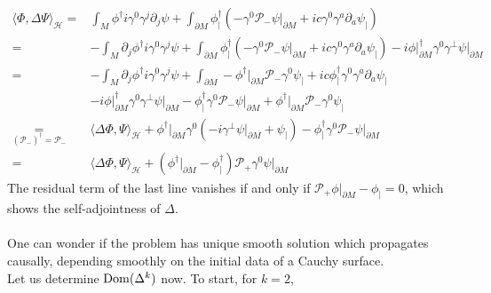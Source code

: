 \begin{equation}
\begin{split}
\langle \Phi, \Delta \Psi \rangle _\mathcal{H}
 = & \int_M \phi^\dagger i \gamma^0 \gamma^j \partial_j \psi 
+ \int_{\partial M} \phi^\dagger_|(  -\gamma^0\mathcal{P}_- \psi\vert_{\partial M} + ic \gamma^0 \gamma^a \partial_a\psi_|)   \\
 = & - \int_M \partial_j \phi^\dagger i \gamma^0 \gamma^j \psi 
+ \int_{\partial M} \phi^\dagger_|(-\gamma^0 \mathcal{P}_- \psi\vert_{\partial M} + ic \gamma^0 \gamma^a \partial_a  \psi_|) 
- i\phi\vert_{\partial M}^\dagger \gamma^0 \gamma^\bot \psi\vert_{\partial M}   \\
= &
- \int_M \partial_j \phi^\dagger i \gamma^0 \gamma^j \psi 
+ \int_{\partial M} - \phi^\dagger\vert_{\partial M}\mathcal{P}_- \gamma^0 \psi_| + ic \phi^\dagger_|\gamma^0 \gamma^a \partial_a  \psi_|  \\
& - i \phi\vert_{\partial M}^\dagger \gamma^0 \gamma^\bot \psi\vert_{\partial M} 
-\phi_|^\dagger \gamma^0 \mathcal{P}_- \psi\vert_{\partial M} 
+ \phi^\dagger\vert_{\partial M}\mathcal{P}_- \gamma^0 \psi_| \\
\underset{(\mathcal{P}_-)^\dagger = \mathcal{P}_-}{=} 
& \langle \Delta\Phi, \Psi \rangle_\mathcal{H}
+\phi^\dagger\vert_{\partial M} \gamma^0 (-i \gamma^\bot \psi\vert_{\partial M} + \psi_|)
- \phi_|^\dagger \gamma^0 \mathcal{P}_- \psi\vert_{\partial M} \\
= & \langle \Delta\Phi, \Psi \rangle_\mathcal{H}
+ (\phi^\dagger\vert_{\partial M} - \phi_|^\dagger)\mathcal{P}_+ \gamma^0 \psi\vert_{\partial M}
\end{split}
\end{equation}
The residual term of the last line vanishes if and only if $\mathcal{P}_+\phi \vert_{\partial M} - \phi_|= 0$, which shows the self-adjointness of $\Delta$. \\\\
One can wonder if the problem has unique smooth solution which propagates causally, \ie depending smoothly on the initial data of a Cauchy surface. \\
Let us determine $\mathrm{Dom} (\Delta^k)$ now. 
To start, for $k =2$, 
